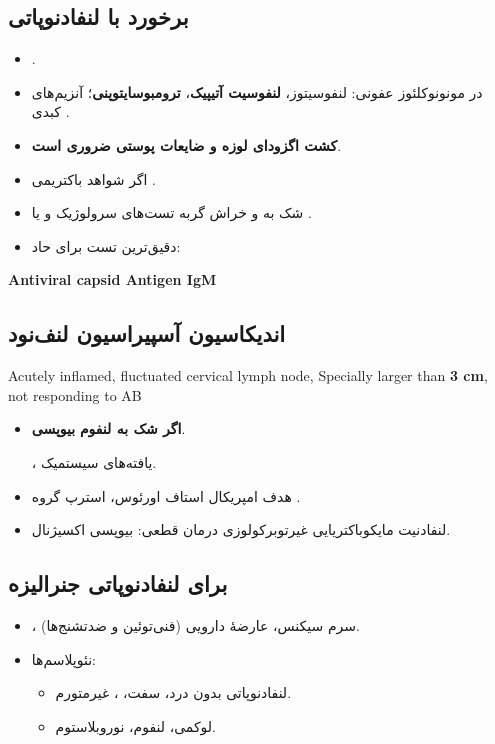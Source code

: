\documentclass[12pt,a4paper]{article}
\begin{document}
\subsection*{برخورد با لنفادنوپاتی}
\begin{itemize}
\item {}.
\item {} در مونونوکلئوز عفونی:
  لنفوسیتوز، \textbf{لنفوسیت آتیپیک}، \textbf{ترومبوسایتوپنی}؛
  آنزیم‌های کبدی \lr{\(\uparrow\)}.
\item \textbf{کشت اگزودای لوزه و ضایعات پوستی ضروری است}.
\item اگر شواهد باکتریمی \LymphArrow{} .
\end{itemize}

\clearpage
{}

\begin{itemize}
\item شک به  و خراش گربه \LymphArrow{} تست‌های سرولوژیک و یا .
\item دقیق‌ترین تست برای  حاد:
\end{itemize}
\begin{latin}
\textbf{Antiviral capsid Antigen IgM}
\end{latin}

\subsection*{اندیکاسیون آسپیراسیون لنف‌نود}
\begin{latin}
Acutely inflamed, fluctuated cervical lymph node,
Specially larger than \textbf{3 cm}, not responding to AB
\end{latin}

\begin{itemize}
\item \textbf{اگر شک به لنفوم} \LymphArrow{} \textbf{بیوپسی}.
  \par {}، یافته‌های سیستمیک.
\item هدف  امپریکال \LymphArrow{} استاف اورئوس، استرپ گروه .
\item لنفادنیت مایکوباکتریایی غیرتوبرکولوزی
  \LymphArrow{} درمان قطعی: بیوپسی اکسیژنال.
\end{itemize}

\subsection*{ برای لنفادنوپاتی جنرالیزه}
\begin{itemize}
\item {}، سرم سیکنس، عارضهٔ دارویی (فنی‌توئین و ضدتشنج‌ها).
\item نئوپلاسم‌ها:
  \begin{itemize}
  \item لنفادنوپاتی بدون درد، سفت، ، غیرمتورم.
  \item لوکمی، لنفوم، نوروبلاستوم.
  \end{itemize}
\end{itemize}
\end{document}

